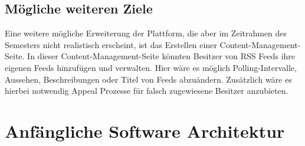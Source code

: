 \subsection{Mögliche weiteren Ziele}
Eine weitere mögliche Erweiterung der Plattform, die aber im Zeitrahmen des Semesters nicht realistisch erscheint, ist das Erstellen einer Content-Management-Seite.
In dieser Content-Management-Seite könnten Besitzer von RSS Feeds ihre eigenen Feeds hinzufügen und verwalten.
Hier wäre es möglich Polling-Intervalle, Aussehen, Beschreibungen oder Titel von Feeds abzuändern.
Zusätzlich wäre es hierbei notwendig Appeal Prozesse für falsch zugewiesene Besitzer anzubieten.

\section{Anfängliche Software Architektur}
